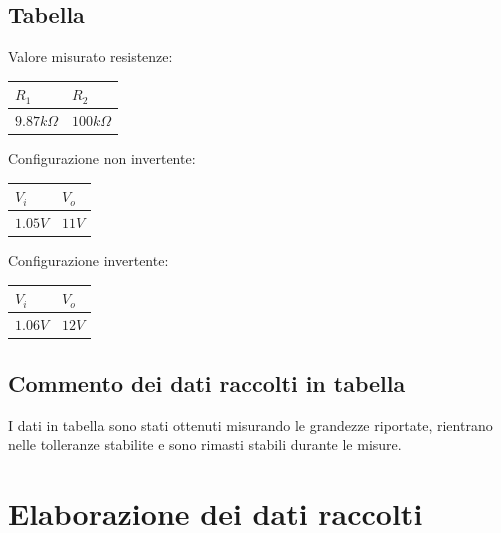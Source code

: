 \documentclass[12pt]{article}
\begin{document}
\subsection{Tabella}
Valore misurato resistenze:\\
\begin{center}
        \begin{tabular}{|p{2cm}|p{2cm}|}
            \hline
            \rowcolor{Green} $R_1$ & $R_2$ \\
            \hline
            \rowcolor{LimeGreen} $9.87k\Omega$ & $100k\Omega$  \\ 
            \hline
        \end{tabular}
        \label{Valore resistenze}
\end{center}
\noindent
Configurazione non invertente:\\
\begin{center}
    \begin{tabular}{|p{2cm} |p{2cm}|}
        \hline
        \rowcolor{Green} $V_i$ & $V_o$  \\
        \hline
        \rowcolor{LimeGreen} $1.05V$ & $11V$  \\ 
        \hline
    \end{tabular}
    \label{Valore resistenze}
\end{center}

\noindent
Configurazione invertente:\\
\begin{center}
    \begin{tabular}{|p{2cm} |p{2cm}|}
        \hline
        \rowcolor{Green} $V_i$ & $V_o$  \\
        \hline
        \rowcolor{LimeGreen} $1.06V$ & $12V$  \\ 
        \hline
    \end{tabular}
    \label{Valore resistenze}
\end{center}
\subsection{Commento dei dati raccolti in tabella}
I dati in tabella sono stati ottenuti misurando le grandezze riportate, rientrano nelle
tolleranze stabilite e sono rimasti stabili durante le misure.\\
\newpage
\section{Elaborazione dei dati raccolti}
\end{document}
